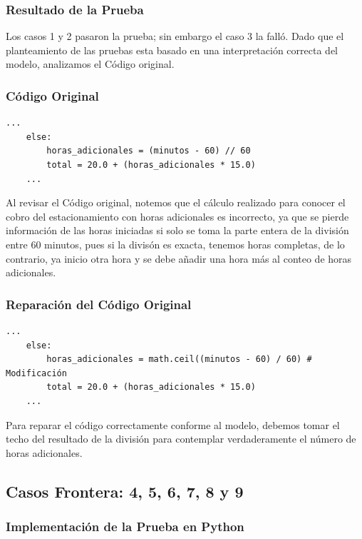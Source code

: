 \documentclass[11pt,letterpaper]{article}
\begin{document}
\subsubsection{Resultado de la Prueba}
\label{sec:org06628f4}

Los casos 1 y 2 pasaron la prueba; sin embargo el caso 3 la falló. Dado que el planteamiento de las pruebas esta basado en una interpretación correcta del modelo, analizamos el Código original.
\subsubsection{Código Original}
\label{sec:orgcd1ef65}


\begin{lstlisting}[style=practica]
    ...
    else:
        horas_adicionales = (minutos - 60) // 60
        total = 20.0 + (horas_adicionales * 15.0)
    ...
\end{lstlisting}

Al revisar el Código original, notemos que el cálculo realizado para conocer el cobro del estacionamiento con horas adicionales es incorrecto, ya que se pierde información de las horas iniciadas si solo se toma la parte entera de la división entre 60 minutos, pues si la divisón es exacta, tenemos horas completas, de lo contrario, ya inicio otra hora y se debe añadir una hora más al conteo de horas adicionales.
\subsubsection{Reparación del Código Original}
\label{sec:orgc6dfd15}


\begin{lstlisting}[style=practica]
    ...
    else:
        horas_adicionales = math.ceil((minutos - 60) / 60) # Modificación
        total = 20.0 + (horas_adicionales * 15.0)
    ...
\end{lstlisting}

Para reparar el código correctamente conforme al modelo, debemos tomar el techo del resultado de la división para contemplar verdaderamente el número de horas adicionales.
\subsection{Casos Frontera: 4, 5, 6, 7, 8 y 9}
\label{sec:org27cfb69}

\subsubsection{Implementación de la Prueba en Python}
\label{sec:orgb1df975}
\end{document}
